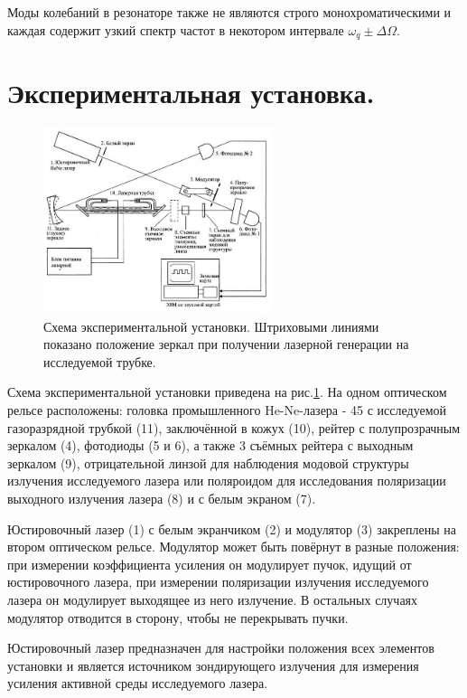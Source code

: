 \documentclass[a4paper, 12pt, twoside]{article}
\begin{document}
	Моды колебаний в резонаторе также не являются строго монохроматическими и каждая содержит узкий спектр частот в некотором интервале $\omega_q \pm \Delta \Omega$.
	\newpage
	\section{Экспериментальная установка.}
	
		\begin{figure}[H]
			\centering
			\includegraphics[width =  0.6\textwidth]{scheme}
			\caption{Схема экспериментальной установки. Штриховыми линиями показано положение зеркал при получении лазерной генерации на исследуемой трубке.}
			\label{scheme}
		\end{figure}
	
	Схема экспериментальной установки приведена на рис.\ref{scheme}. На одном оптическом рельсе расположены: головка промышленного He-Ne-лазера \CYRL \CYRG - 45 с исследуемой газоразрядной трубкой (11), заключённой в кожух (10), рейтер с полупрозрачным зеркалом (4), фотодиоды (5 и 6), а также 3 съёмных рейтера с выходным зеркалом (9), отрицательной линзой для наблюдения модовой структуры излучения исследуемого лазера или поляроидом для исследования поляризации выходного излучения лазера (8) и с белым экраном (7).
	
	Юстировочный лазер (1) с белым экранчиком (2) и модулятор (3) закреплены на втором оптическом рельсе. Модулятор может быть повёрнут в разные положения: при измерении коэффициента усиления он модулирует пучок, идущий от юстировочного лазера, при измерении поляризации излучения исследуемого лазера он модулирует выходящее из него излучение. В остальных случаях модулятор отводится в сторону, чтобы не перекрывать пучки.
	
	Юстировочный лазер предназначен для настройки положения всех элементов установки и является источником зондирующего излучения для измерения усиления активной среды исследуемого лазера.
	
\end{document}
